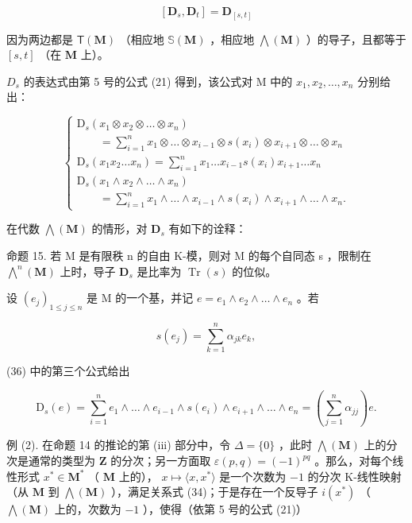 \[
[ \mathbf {D} _ {s}, \mathbf {D} _ {t} ] = \mathbf {D} _ {[ s, t ]}\tag{35}
\]

因为两边都是 \(\mathsf{T}(\mathbf{M})\) （相应地 \(\mathbb{S}(\mathbf{M})\) ，相应地 \(\bigwedge (\mathbf{M})\) ）的导子，且都等于 \([s, t]\) （在 \(\mathbf{M}\) 上）。

\(D_{s}\) 的表达式由第 5 号的公式 (21) 得到，该公式对 M 中的 \(x_{1}, x_{2}, \ldots, x_{n}\) 分别给出：

\[
\left\{ \begin{array}{l} \mathrm{D} _ {s} (x _ {1} \otimes x _ {2} \otimes \dots \otimes x _ {n}) \\ \qquad = \sum_ {i = 1} ^ {n} x _ {1} \otimes \dots \otimes x _ {i - 1} \otimes s (x _ {i}) \otimes x _ {i + 1} \otimes \dots \otimes x _ {n} \\ \mathrm{D} _ {s} (x _ {1} x _ {2} \dots x _ {n}) = \sum_ {i = 1} ^ {n} x _ {1} \dots x _ {i - 1} s (x _ {i}) x _ {i + 1} \dots x _ {n} \\ \mathrm{D} _ {s} (x _ {1} \wedge x _ {2} \wedge \dots \wedge x _ {n}) \\ \qquad = \sum_ {i = 1} ^ {n} x _ {1} \wedge \dots \wedge x _ {i - 1} \wedge s (x _ {i}) \wedge x _ {i + 1} \wedge \dots \wedge x _ {n}. \end{array} \right.\tag{36}
\]

在代数 \(\bigwedge (\mathbf{M})\) 的情形，对 \(\mathbf{D}_s\) 有如下的诠释：

命题 15. 若 M 是有限秩 n 的自由 K-模，则对 M 的每个自同态 s ，限制在 \(\bigwedge^{n}(\mathbf{M})\) 上时，导子 \(\mathbf{D}_{s}\) 是比率为 \(\operatorname{Tr}(s)\) 的位似。

设 \((e_j)_{1\leqslant j\leqslant n}\) 是 M 的一个基，并记 \(e = e_1\wedge e_2\wedge \dots \wedge e_n\) 。若

\[
s (e _ {j}) = \sum_ {k = 1} ^ {n} \alpha_ {j k} e _ {k},
\]

(36) 中的第三个公式给出

\[
\mathrm{D} _ {s} (e) = \sum_ {i = 1} ^ {n} e _ {1} \wedge \dots \wedge e _ {i - 1} \wedge s \left(e _ {i}\right) \wedge e _ {i + 1} \wedge \dots \wedge e _ {n} = \left(\sum_ {j = 1} ^ {n} \alpha_ {j j}\right) e.
\]

例 (2). 在命题 14 的推论的第 (iii) 部分中，令 \(\Delta = \{0\}\) ，此时 \(\bigwedge (\mathbf{M})\) 上的分次是通常的类型为 \(\mathbf{Z}\) 的分次；另一方面取 \(\varepsilon(p, q) = (-1)^{pq}\) 。那么，对每个线性形式 \(x^{*} \in \mathbf{M}^{*}\) （ \(\mathbf{M}\) 上的）， \(x \mapsto \langle x, x^{*} \rangle\) 是一个次数为 \(-1\) 的分次 K-线性映射（从 \(\mathbf{M}\) 到 \(\bigwedge (\mathbf{M})\) ），满足关系式 (34)；于是存在一个反导子 \(i(x^{*})\) （ \(\bigwedge (\mathbf{M})\) 上的，次数为 \(-1\) ），使得（依第 5 号的公式 (21)）

